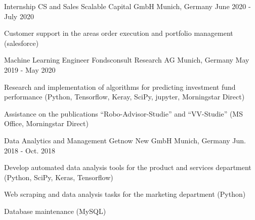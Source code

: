 \begin{cventries}
\cventry
{Internship CS and Sales} %
{Scalable Capital GmbH} %
{Munich, Germany} %
{June 2020 - July 2020} %
{ %
\begin{cvitems}
\item {Customer support in the areas order execution and portfolio management (salesforce)}
\end{cvitems}
}


\cventry
{Machine Learning Engineer} %
{Fondsconsult Research AG} %
{Munich, Germany} %
{May 2019 - May 2020} %
{ %
\begin{cvitems}
\item {Research and implementation of algorithms for predicting  investment fund performance (Python, Tensorflow, Keray, SciPy, jupyter, Morningstar Direct)}
\item {Assistance on the publications ``Robo-Advisor-Studie'' and ``VV-Studie'' (MS Office, Morningstar Direct)}
\end{cvitems}
}


\cventry
{Data Analytics and Management} %
{Getnow New GmbH} %
{Munich, Germany} %
{Jun. 2018 - Oct. 2018} %
{ %
\begin{cvitems}
\item {Develop automated data analysis tools for the product and services department (Python, SciPy, Keras, Tensorflow)}
\item {Web scraping and data analysis tasks for the marketing department (Python)}
\item {Database maintenance (MySQL)}
\end{cvitems}
}

\end{cventries}